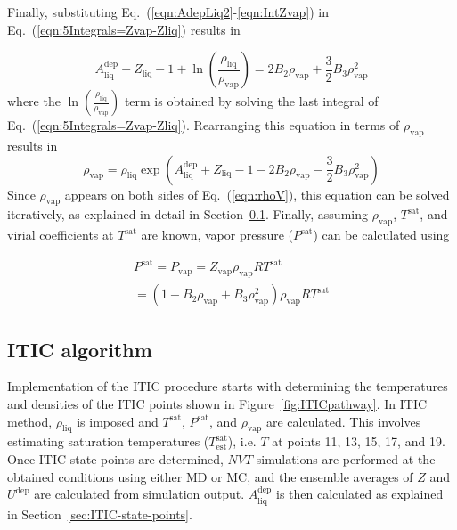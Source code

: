 \documentclass[5p,times]{elsarticle}
\begin{document}
Finally, substituting Eq.~(\ref{eqn:AdepLiq2}-\ref{eqn:IntZvap}) in Eq.~(\ref{eqn:5Integrals=Zvap-Zliq}) results in

\begin{equation}
A^\mathrm{dep}_\mathrm{liq}
+ {Z_{\mathrm{liq}}} - 1 + \ln \left( \frac{{{\rho _{\mathrm{liq}}}}}{{{\rho _{\mathrm{vap}}}}} \right) = 2{B_2} {\rho _{\mathrm{vap}}} + \frac{3}{2}{B_3} \rho _{\mathrm{vap}}^2 
\label{eqn:eqn14}
\end{equation}
where the $\ln \left( \frac{{{\rho _{\mathrm{liq}}}}}{{{\rho _{\mathrm{vap}}}}} \right)$ term is obtained by solving the last integral of Eq.~(\ref{eqn:5Integrals=Zvap-Zliq}). Rearranging this equation in terms of ${\rho_\mathrm{vap}}$ results in
\begin{equation}
\rho _{\mathrm{vap}} = \rho _\mathrm{liq} \exp \left( A^\mathrm{dep}_\mathrm{liq} + {Z_{\mathrm{liq}}} - 1 - 2{B_2} {\rho _{\mathrm{vap}}} - \frac{3}{2}{B_3} \rho _{\mathrm{vap}}^2
\right)
\label{eqn:rhoV}
\end{equation}
Since $\rho_\mathrm{vap}$ appears on both sides of Eq.~(\ref{eqn:rhoV}), this equation can be solved iteratively, as explained in detail in Section~\ref{sec:ITIC-algorithm}. Finally, assuming $\rho_\mathrm{vap}$, $T^\mathrm{sat}$, and virial coefficients at $T^\mathrm{sat}$ are known, vapor pressure ($P^\mathrm{sat}$) can be calculated using

\begin{equation}
\begin{array}{l}
P^\mathrm{sat} = P_\mathrm{vap} = {Z_\mathrm{vap}}{\rho _\mathrm{vap}}RT^\mathrm{sat}
\\
= (1 + {B_2} {\rho_\mathrm{vap}} + {B_3}\rho _\mathrm{vap}^2){\rho _\mathrm{vap}}RT^\mathrm{sat} 
\end{array}
\label{eqn:psat}
\end{equation}



\subsection{ITIC algorithm}\label{sec:ITIC-algorithm}
Implementation of the ITIC procedure starts with determining the temperatures and densities of the ITIC points shown in Figure~\ref{fig:ITICpathway}. In ITIC method, $\rho_\mathrm{liq}$ is imposed and $T^\mathrm{sat}$, $P^\mathrm{sat}$, and $\rho_\mathrm{vap}$ are calculated. This involves estimating saturation temperatures ($T^\mathrm{sat}_\mathrm{est}$), i.e. $T$ at points 11, 13, 15, 17, and 19. Once ITIC state points are determined, $NVT$ simulations are performed at the obtained conditions using either MD or MC, and the ensemble averages of $Z$ and $U^\mathrm{dep}$ are calculated from simulation output. $A^\mathrm{dep}_\mathrm{liq}$ is then calculated as explained in Section~\ref{sec:ITIC-state-points}. 
\end{document}
